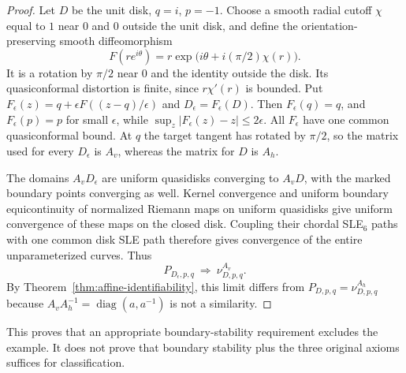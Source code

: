 \documentclass[11pt]{article}
\theoremstyle{definition}\newtheorem{definition}[theorem]{Definition}
\theoremstyle{remark}\newtheorem{remark}[theorem]{Remark}
\newcommand{\nuA}[4]{\nu^{#1}_{#2,#3,#4}}
\begin{document}
\begin{proof}
Let $D$ be the unit disk, $q=i$, $p=-1$. Choose a smooth radial cutoff
$\chi$ equal to $1$ near $0$ and $0$ outside the unit disk, and define
the orientation-preserving smooth diffeomorphism
\[
 F(re^{i\theta})=r\exp\bigl(i\theta+i(\pi/2)\chi(r)\bigr).
\]
It is a rotation by $\pi/2$ near $0$ and the identity outside the disk.
Its quasiconformal distortion is finite, since $r\chi'(r)$ is bounded.
Put $F_\epsilon(z)=q+\epsilon F((z-q)/\epsilon)$ and
$D_\epsilon=F_\epsilon(D)$. Then $F_\epsilon(q)=q$, and $F_\epsilon(p)=p$
for small $\epsilon$, while $\sup_z|F_\epsilon(z)-z|\leq2\epsilon$.
All $F_\epsilon$ have one common quasiconformal bound. At $q$ the target
tangent has rotated by $\pi/2$, so the matrix used for every
$D_\epsilon$ is $A_v$, whereas the matrix for $D$ is $A_h$.

The domains $A_vD_\epsilon$ are uniform quasidisks converging to $A_vD$,
with the marked boundary points converging as well. Kernel convergence
and uniform boundary equicontinuity of normalized Riemann maps on
uniform quasidisks give uniform convergence of these maps on the closed
disk. Coupling their chordal SLE$_6$ paths with one common disk SLE path
therefore gives convergence of the entire unparameterized curves. Thus
\[
 P_{D_\epsilon,p,q}\ \Longrightarrow\ \nuA{A_v}{D}{p}{q}.
\]
By Theorem~\ref{thm:affine-identifiability}, this limit differs from
$P_{D,p,q}=\nuA{A_h}{D}{p}{q}$ because
$A_vA_h^{-1}=\operatorname{diag}(a,a^{-1})$ is not a similarity.
\end{proof}

This proves that an appropriate boundary-stability requirement excludes
the example. It does not prove that boundary stability plus the three
original axioms suffices for classification.
\end{document}

